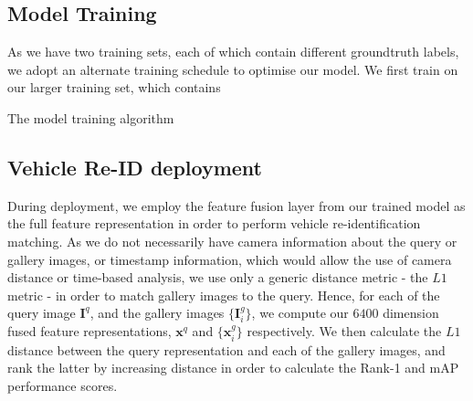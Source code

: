 \documentclass[10pt,twocolumn,letterpaper]{article}
\begin{document}
\subsection{Model Training}

As we have two training sets, each of which contain different groundtruth labels, we adopt an alternate training schedule to optimise our model. We first train on our larger training set, which contains 

\begin{algorithm}[t]
  \caption{The model training algorithm}
  \label{A:model_training}
  \begin{algorithmic}
    \STATE{$\bullet$ Initialise output layers of $\mathcal{M}$ randomly}



        \ENDIF


      \ENDFOR
    \ENDFOR
          
  \end{algorithmic}
\end{algorithm}

\subsection{Vehicle Re-ID deployment}

During deployment, we employ the feature fusion layer from our trained model as the full feature representation in order to perform vehicle re-identification matching. As we do not necessarily have camera information about the query or gallery images, or timestamp information, which would allow the use of camera distance or time-based analysis, we use only a generic distance metric - the $L1$ metric - in order to match gallery images to the query. Hence, for each of the query image $\mathbf{I}^q$, and the gallery images $\{\mathbf{I}_i^g\}$,  we compute our $6400$ dimension fused feature representations, $\mathbf{x}^q$ and $\{\mathbf{x}_i^g\}$ respectively. We then calculate the $L1$ distance between the query representation and each of the gallery images, and rank the latter by increasing distance in order to calculate the Rank-1 and mAP performance scores.
\end{document}
